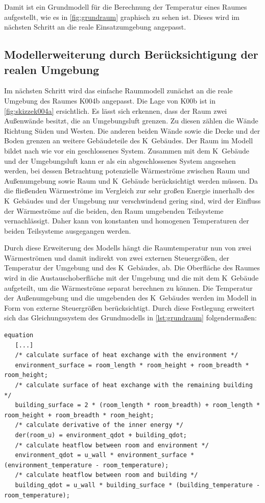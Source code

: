 Damit ist ein Grundmodell für die Berechnung der Temperatur eines Raumes aufgestellt, wie es in \ref{fig:grundraum} graphisch zu sehen ist. Dieses wird im nächsten Schritt an die reale Einsatzumgebung angepasst.


\subsection{Modellerweiterung durch Berücksichtigung der realen Umgebung}

Im nächsten Schritt wird das einfache Raummodell zunächst an die reale Umgebung des Raumes K004b angepasst. Die Lage von K00b ist in \ref{fig:skizzek004a} ersichtlich. Es lässt sich erkennen, dass der Raum zwei Außenwände besitzt, die an Umgebungsluft grenzen. Zu diesen zählen die Wände Richtung Süden und Westen. Die anderen beiden Wände sowie die Decke und der Boden grenzen an weitere Gebäudeteile des K~Gebäudes. Der Raum im Modell bildet nach wie vor ein geschlossenes System. Zusammen mit dem K~Gebäude und der Umgebungsluft kann er als ein abgeschlossenes System angesehen werden, bei dessen Betrachtung potenzielle Wärmeströme zwischen Raum und Außenumgebung sowie Raum und K~Gebäude berücksichtigt werden müssen. Da die fließenden Wärmeströme im Vergleich zur sehr großen Energie innerhalb des K~Gebäudes und der Umgebung nur verschwindend gering sind, wird der Einfluss der Wärmeströme auf die beiden, den Raum umgebenden Teilsysteme vernachlässigt. Daher kann von konstanten und homogenen Temperaturen der beiden Teilsysteme ausgegangen werden.

Durch diese Erweiterung des Modells hängt die Raumtemperatur nun von zwei Wärmeströmen und damit indirekt von zwei externen Steuergrößen, der Temperatur der Umgebung und des K~Gebäudes, ab. Die Oberfläche des Raumes wird in die Austauschoberfläche mit der Umgebung und die mit dem K~Gebäude aufgeteilt, um die Wärmeströme separat berechnen zu können. Die Temperatur der Außenumgebung und die umgebenden des K~Gebäudes werden im Modell in Form von externe Steuergrößen berücksichtigt. Durch diese Festlegung erweitert sich das Gleichungssystem des Grundmodells in \ref{lst:grundraum} folgendermaßen:
\begin{lstlisting}[language=Modelica, caption={Erweitertes Gleichungssystem Modell des Raumes unter Berücksichtigung der realen Umgebung in Modelica}, label=lst:raumeins]
equation
   [...]
   /* calculate surface of heat exchange with the environment */
   environment_surface = room_length * room_height + room_breadth * room_height;
   /* calculate surface of heat exchange with the remaining building */
   building_surface = 2 * (room_length * room_breadth) + room_length * room_height + room_breadth * room_height;
   /* calculate derivative of the inner energy */
   der(room_u) = environment_qdot + building_qdot;
   /* calculate heatflow between room and environment */
   environment_qdot = u_wall * environment_surface * (environment_temperature - room_temperature);
   /* calculate heatflow between room and building */
   building_qdot = u_wall * building_surface * (building_temperature - room_temperature);
\end{lstlisting}

